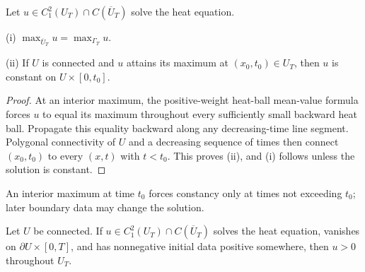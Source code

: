 \begin{theorem}
\label{thm:strong-maximum-principle-heat-equation}

Let $u\in C_1^2(U_T)\cap C(\overline U_T)$ solve the heat equation.

(i) $\max_{\overline U_T}u=\max_{\Gamma_T}u$.

(ii) If $U$ is connected and $u$ attains its maximum at
$(x_0,t_0)\in U_T$, then $u$ is constant on $U\times[0,t_0]$.
\end{theorem}
\begin{proof}
\sketch At an interior maximum, the positive-weight heat-ball mean-value
formula forces $u$ to equal its maximum throughout every sufficiently small
backward heat ball. Propagate this equality backward along any decreasing-time
line segment. Polygonal connectivity of $U$ and a decreasing sequence of times
then connect $(x_0,t_0)$ to every $(x,t)$ with $t<t_0$. This proves (ii), and
(i) follows unless the solution is constant.
\end{proof}

\begin{remark}
\label{rem:strong-maximum-principle-heat-time-intuition}

An interior maximum at time $t_0$ forces constancy only at times not exceeding
$t_0$; later boundary data may change the solution.
\end{remark}

\begin{remark}
\label{rem:strong-maximum-principle-heat-positivity}

Let $U$ be connected. If $u\in C_1^2(U_T)\cap C(\overline U_T)$ solves the
heat equation, vanishes on $\partial U\times[0,T]$, and has nonnegative initial
data positive somewhere, then $u>0$ throughout $U_T$.
\end{remark}

